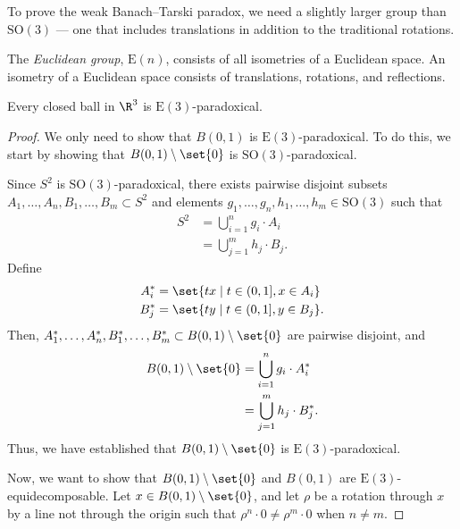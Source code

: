 \documentclass[10pt]{mypackage2}
\begin{document}
To prove the weak Banach--Tarski paradox, we need a slightly larger group than $\text{SO}(3)$ --- one that includes translations in addition to the traditional rotations.
\begin{definition}
  The \textit{Euclidean group}, $\text{E}(n)$, consists of all isometries of a Euclidean space. An isometry of a Euclidean space consists of translations, rotations, and reflections.
\end{definition}
\begin{corollary}
  Every closed ball in $\R^3$ is $\text{E}(3)$-paradoxical.
\end{corollary}
\begin{proof}
  We only need to show that $B(0,1)$ is $\text{E}(3)$-paradoxical. To do this, we start by showing that $B(0,1)\setminus \set{0}$ is $\text{SO}(3)$-paradoxical.\newline

  Since $S^{2}$ is $\text{SO}(3)$-paradoxical, there exists pairwise disjoint subsets $A_1,\dots,A_n,B_1,\dots,B_m\subset S^2$ and elements $g_1,\dots,g_n,h_1,\dots,h_m\in \text{SO}(3)$ such that
  \begin{align*}
    S^{2} &= \bigcup_{i=1}^{n}g_i\cdot A_i\\
          &= \bigcup_{j=1}^{m}h_j\cdot B_j.
  \end{align*}
  Define
  \begin{align*}
    A_i^{\ast} &= \set{tx\mid t\in (0,1], x\in A_i}\\
    B_j^{\ast} &= \set{ty\mid t\in (0,1], y\in B_j}.
  \end{align*}
  Then, $A_1^{\ast},\dots,A_n^{\ast},B_1^{\ast},\dots,B_m^{\ast}\subset B(0,1)\setminus \set{0}$ are pairwise disjoint, and
  \begin{align*}
    B(0,1)\setminus \set{0} &= \bigcup_{i=1}^{n}g_i\cdot A_i^{\ast}\\
                            &= \bigcup_{j=1}^{m}h_j\cdot B_j^{\ast}.
  \end{align*}
  Thus, we have established that $B(0,1)\setminus \set{0}$ is $\text{E}(3)$-paradoxical.\newline

  Now, we want to show that $B(0,1)\setminus \set{0}$ and $B(0,1)$ are $\text{E}(3)$-equidecomposable. Let $x\in B(0,1)\setminus \set{0}$, and let $\rho$ be a rotation through $x$ by a line not through the origin such that $\rho^{n}\cdot 0\neq \rho^{m}\cdot 0$ when $n\neq m$.\newline


\end{proof}
\end{document}

